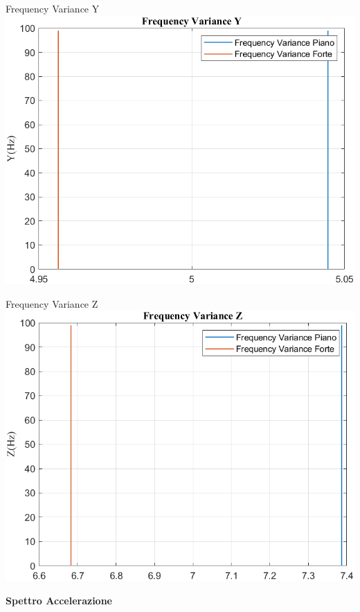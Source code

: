 \documentclass[beamer]{standalone}
\begin{document}
	\begin{frame}{{Frequency Variance Y}}
		\centering\includegraphics[height=.8\textheight]{figure/Acc/Trasformata/Frequency VarianceY}
	\end{frame}
	
	\begin{frame}{{Frequency Variance Z}}
		\centering\includegraphics[height=.8\textheight]{figure/Acc/Trasformata/Frequency VarianceZ}
	\end{frame}
	
	\begin{frame}
		\color{blue}\centering\huge{\textbf{Spettro Accelerazione}}
	\end{frame}
	
\end{document}
